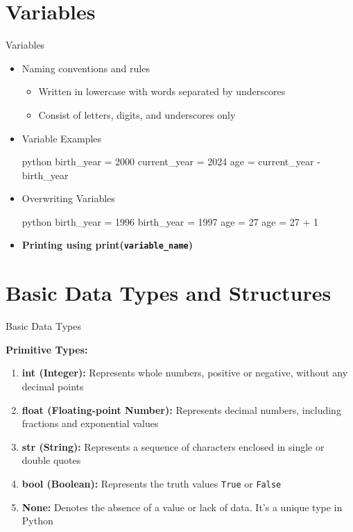 \documentclass[
	11pt, 
]{beamer}
\begin{document}
\section{Variables}
\begin{frame}[fragile]{Variables}
    \begin{itemize}
        \item Naming conventions and rules \smallskip
                \begin{itemize}
                    \item Written in lowercase with words separated by underscores \smallskip
                    \item Consist of letters, digits, and underscores only
                \end{itemize} \bigskip
            
        \item Variable Examples \smallskip
            \begin{mintedbox}{python}
birth_year = 2000
current_year = 2024
age = current_year - birth_year
            \end{mintedbox}\smallskip
    

   \item Overwriting Variables \smallskip
    \begin{mintedbox}{python}
birth_year = 1996
birth_year = 1997
age = 27
age = 27 + 1
    \end{mintedbox}
    \item \textbf{Printing using print(\texttt{variable\_name})}
    \end{itemize}
\end{frame}


\section{Basic Data Types and Structures}
\begin{frame}{Basic Data Types}

\textbf{Primitive Types:} \bigskip
    \begin{enumerate}
        \item \textbf{int (Integer):} Represents whole numbers, positive or negative, without any decimal points \smallskip
        \item \textbf{float (Floating-point Number):} Represents decimal numbers, including fractions and exponential values \smallskip
        \item \textbf{str (String):} Represents a sequence of characters enclosed in single or double quotes \smallskip
        \item \textbf{bool (Boolean):} Represents the truth values \texttt{True} or \texttt{False} \smallskip
        \item \textbf{None:} Denotes the absence of a value or lack of data. It's a unique type in Python \smallskip
    \end{enumerate}
\end{frame}
\end{document}
